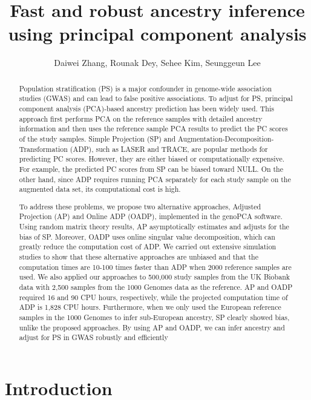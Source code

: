 \documentclass{article}
\title{
  Fast and robust ancestry inference
  using principal component analysis
}
\author{Daiwei Zhang, Rounak Dey, Sehee Kim, Seunggeun Lee}
\date{}
\begin{document}
\maketitle

\begin{abstract}
Population stratification (PS) is a major confounder in genome-wide association studies (GWAS) and can lead to false positive associations. To adjust for PS, principal component analysis (PCA)-based ancestry prediction has been widely used. This approach first performs PCA on the reference samples with detailed ancestry information and then uses the reference sample PCA results to predict the PC scores of the study samples. Simple Projection (SP) and Augmentation-Decomposition-Transformation (ADP), such as LASER and TRACE, are popular methods for predicting PC scores. However, they are either biased or computationally expensive. For example, the predicted PC scores from SP can be biased toward NULL. On the other hand, since ADP requires running PCA separately for each study sample on the augmented data set, its computational cost is high.

To address these problems, we propose two alternative approaches, Adjusted Projection (AP) and Online ADP (OADP), implemented in the genoPCA software. Using random matrix theory results, AP asymptotically estimates and adjusts for the bias of SP. Moreover, OADP uses online singular value decomposition, which can greatly reduce the computation cost of ADP. We carried out extensive simulation studies to show that these alternative approaches are unbiased and that the computation times are 10-100 times faster than ADP when 2000 reference samples are used. We also applied our approaches to 500,000 study samples from the UK Biobank data with 2,500 samples from the 1000 Genomes data as the reference. AP and OADP required 16 and 90 CPU hours, respectively, while the projected computation time of ADP is 1,828 CPU hours. Furthermore, when we only used the European reference samples in the 1000 Genomes to infer sub-European ancestry, SP clearly showed bias, unlike the proposed approaches. By using AP and OADP, we can infer ancestry and adjust for PS in GWAS robustly and efficiently   
    
\end{abstract}

\section{Introduction}
\end{document}
